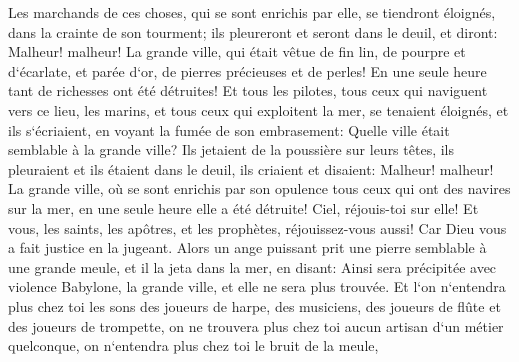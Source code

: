 \verse Les marchands de ces choses, qui se sont enrichis par elle, se tiendront éloignés, dans la crainte de son tourment; ils pleureront et seront dans le deuil, 
\verse et diront: Malheur! malheur! La grande ville, qui était vêtue de fin lin, de pourpre et d`écarlate, et parée d`or, de pierres précieuses et de perles! En une seule heure tant de richesses ont été détruites! 
\verse Et tous les pilotes, tous ceux qui naviguent vers ce lieu, les marins, et tous ceux qui exploitent la mer, se tenaient éloignés, 
\verse et ils s`écriaient, en voyant la fumée de son embrasement: Quelle ville était semblable à la grande ville? 
\verse Ils jetaient de la poussière sur leurs têtes, ils pleuraient et ils étaient dans le deuil, ils criaient et disaient: Malheur! malheur! La grande ville, où se sont enrichis par son opulence tous ceux qui ont des navires sur la mer, en une seule heure elle a été détruite! 
\verse Ciel, réjouis-toi sur elle! Et vous, les saints, les apôtres, et les prophètes, réjouissez-vous aussi! Car Dieu vous a fait justice en la jugeant. 
\verse Alors un ange puissant prit une pierre semblable à une grande meule, et il la jeta dans la mer, en disant: Ainsi sera précipitée avec violence Babylone, la grande ville, et elle ne sera plus trouvée. 
\verse Et l`on n`entendra plus chez toi les sons des joueurs de harpe, des musiciens, des joueurs de flûte et des joueurs de trompette, on ne trouvera plus chez toi aucun artisan d`un métier quelconque, on n`entendra plus chez toi le bruit de la meule, 
